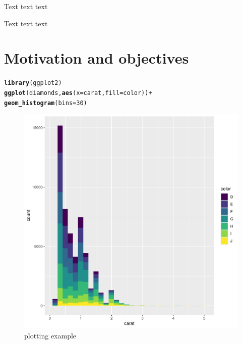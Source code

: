 \documentclass[12pt]{report}\usepackage[]{graphicx}\usepackage[]{xcolor}
\makeatletter
\newcommand{\hlnum}[1]{\textcolor[rgb]{0.686,0.059,0.569}{#1}}%
\newcommand{\hlopt}[1]{\textcolor[rgb]{0,0,0}{#1}}%
\newcommand{\hlstd}[1]{\textcolor[rgb]{0.345,0.345,0.345}{#1}}%
\newcommand{\hlkwc}[1]{\textcolor[rgb]{0.333,0.667,0.333}{#1}}%
\newcommand{\hlkwd}[1]{\textcolor[rgb]{0.737,0.353,0.396}{\textbf{#1}}}%
\newenvironment{kframe}{%
 \def\at@end@of@kframe{}%
 \ifinner\ifhmode%
  \def\at@end@of@kframe{\end{minipage}}%
  \begin{minipage}{\columnwidth}%
 \fi\fi%
 \def\FrameCommand##1{\hskip\@totalleftmargin \hskip-\fboxsep
 \colorbox{shadecolor}{##1}\hskip-\fboxsep
     \hskip-\linewidth \hskip-\@totalleftmargin \hskip\columnwidth}%
 \MakeFramed {\advance\hsize-\width
   \@totalleftmargin\z@ \linewidth\hsize
   \@setminipage}}%
 {\par\unskip\endMakeFramed%
 \at@end@of@kframe}
\newenvironment{knitrout}{}{} %
\makeatother
\begin{document}
    Text text text

    Text text text

    \pagebreak

    \chapter*{Motivation and objectives}\label{ch:sec1}

\begin{knitrout}
\color{fgcolor}\begin{kframe}
\begin{alltt}
\hlkwd{library}\hlstd{(ggplot2)}
\hlkwd{ggplot}\hlstd{(diamonds,} \hlkwd{aes}\hlstd{(}\hlkwc{x} \hlstd{= carat,} \hlkwc{fill} \hlstd{= color))} \hlopt{+}
  \hlkwd{geom_histogram}\hlstd{(}\hlkwc{bins} \hlstd{=} \hlnum{30}\hlstd{)}
\end{alltt}
\end{kframe}\begin{figure}[H]

{\centering \includegraphics[width=0.75\linewidth]{figure/unnamed-chunk-1-1} 

}

\caption{\label{fig:fig1}plotting example}\label{fig:unnamed-chunk-1}
\end{figure}

\end{knitrout}
\end{document}
